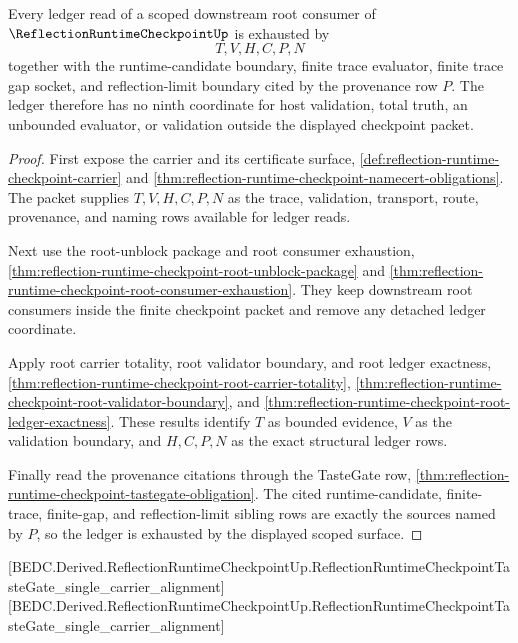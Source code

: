 \begin{theorem}
\label{thm:reflection-runtime-checkpoint-scoped-ledger-exhaustion}
Every ledger read of a scoped downstream root consumer of $\ReflectionRuntimeCheckpointUp$ is exhausted by
$$
T,V,H,C,P,N
$$
together with the runtime-candidate boundary, finite trace evaluator, finite trace gap socket, and reflection-limit boundary cited by the provenance row $P$. The ledger therefore has no ninth coordinate for host validation, total truth, an unbounded evaluator, or validation outside the displayed checkpoint packet.
\end{theorem}
\begin{proof}
First expose the carrier and its certificate surface, \autoref{def:reflection-runtime-checkpoint-carrier} and \autoref{thm:reflection-runtime-checkpoint-namecert-obligations}. The packet supplies $T,V,H,C,P,N$ as the trace, validation, transport, route, provenance, and naming rows available for ledger reads.

Next use the root-unblock package and root consumer exhaustion, \autoref{thm:reflection-runtime-checkpoint-root-unblock-package} and \autoref{thm:reflection-runtime-checkpoint-root-consumer-exhaustion}. They keep downstream root consumers inside the finite checkpoint packet and remove any detached ledger coordinate.

Apply root carrier totality, root validator boundary, and root ledger exactness, \autoref{thm:reflection-runtime-checkpoint-root-carrier-totality}, \autoref{thm:reflection-runtime-checkpoint-root-validator-boundary}, and \autoref{thm:reflection-runtime-checkpoint-root-ledger-exactness}. These results identify $T$ as bounded evidence, $V$ as the validation boundary, and $H,C,P,N$ as the exact structural ledger rows.

Finally read the provenance citations through the TasteGate row, \autoref{thm:reflection-runtime-checkpoint-tastegate-obligation}. The cited runtime-candidate, finite-trace, finite-gap, and reflection-limit sibling rows are exactly the sources named by $P$, so the ledger is exhausted by the displayed scoped surface.
\end{proof}

[BEDC.Derived.ReflectionRuntimeCheckpointUp.ReflectionRuntimeCheckpointTasteGate\_single\_carrier\_alignment]
[BEDC.Derived.ReflectionRuntimeCheckpointUp.ReflectionRuntimeCheckpointTasteGate\_single\_carrier\_alignment]

